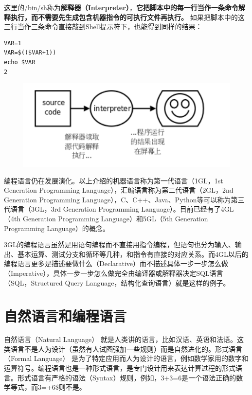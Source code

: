 \documentclass[12pt]{book}
\begin{document}
这里的/bin/sh称为\textbf{解释器（Interpreter）}，\textbf{它把脚本中的每一行当作一条命令解释执行，而不需要先生成包含机器指令的可执行文件再执行。}
如果把脚本中的这三行当作三条命令直接敲到Shell提示符下，也能得到同样的结果：
\begin{verbatim}
VAR=1
VAR=$(($VAR+1))
echo $VAR
2
\end{verbatim}

\begin{figure}[H]
\centering
\includegraphics[scale=0.7]{image//C语言入门//程序的基本概念//3.png}
\end{figure}

编程语言仍在发展演化。以上介绍的机器语言称为第一代语言（1GL，1st Generation Programming Language），汇编语言称为第二代语言（2GL，2nd Generation Programming Language），C、C++、Java、Python等可以称为第三代语言（3GL，3rd Generation Programming Language）。目前已经有了4GL（4th  Generation Programming Language）和5GL（5th Generation Programming Language）的概念。

3GL的编程语言虽然是用语句编程而不直接用指令编程，但语句也分为输入、输出、基本运算、测试分支和循环等几种，和指令有直接的对应关系。而4GL以后的编程语言更多是描述要做什么（Declarative）而不描述具体一步一步怎么做（Imperative），具体一步一步怎么做完全由编译器或解释器决定SQL语言
（SQL，Structured Query Language，结构化查询语言）就是这样的例子。


\section{自然语言和编程语言}

自然语言（Natural Language）
就是人类讲的语言，比如汉语、英语和法语。这类语言不是人为设计（虽然有人试图强加一些规则）而是自然进化的。形式语言（Formal
Language）
是为了特定应用而人为设计的语言，例如数学家用的数字和运算符号。编程语言也是一种形式语言，是专门设计用来表达计算过程的形式语言。形式语言有严格的语法（Syntax）规则，例如，3+3=6是一个语法正确的数学等式，而3=+6\$则不是。
\end{document}
